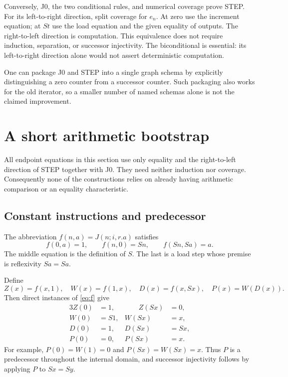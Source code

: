 \documentclass[11pt,letterpaper]{article}
\theoremstyle{definition}\newtheorem{definition}[theorem]{Definition}
\theoremstyle{remark}\newtheorem{remark}[theorem]{Remark}
\begin{document}
Conversely, J0, the two conditional rules, and numerical coverage
prove STEP. For its left-to-right direction, split coverage for $e_n$.
At zero use the increment equation; at $St$ use the load equation
and the given equality of outputs. The right-to-left direction is
computation. This equivalence does not require induction, separation,
or successor injectivity. The biconditional is essential: its
left-to-right direction alone would not assert deterministic computation.

One can package J0 and STEP into a single graph schema by explicitly
distinguishing a zero counter from a successor counter. Such packaging
also works for the old iterator, so a smaller number of named schemas
alone is not the claimed improvement.

\section{A short arithmetic bootstrap}

All endpoint equations in this section use only equality and the
right-to-left direction of STEP together with J0. They need neither
induction nor coverage. Consequently none of the constructions relies
on already having arithmetic comparison or an equality characteristic.

\subsection{Constant instructions and predecessor}

The abbreviation $f(n,a)=J(n;i,r.a)$ satisfies
\begin{equation}
 f(0,a)=1,\qquad f(n,0)=Sn,\qquad f(Sn,Sa)=a.
 \label{eq:f}
\end{equation}
The middle equation is the definition of $S$. The last is a load
step whose premise is reflexivity $Sa=Sa$.

Define
\[
 Z(x)=f(x,1),\quad W(x)=f(1,x),\quad
 D(x)=f(x,Sx),\quad P(x)=W(D(x)).
\]
Then direct instances of \eqref{eq:f} give
\begin{alignat}{3}
 Z(0)&=1,&\qquad Z(Sx)&=0,\label{eq:Z}\\
 W(0)&=S1,& W(Sx)&=x,\label{eq:W}\\
 D(0)&=1,& D(Sx)&=Sx,\label{eq:D}\\
 P(0)&=0,& P(Sx)&=x.\label{eq:P}
\end{alignat}
For example, $P(0)=W(1)=0$ and $P(Sx)=W(Sx)=x$.
Thus $P$ is a predecessor throughout the internal domain, and successor
injectivity follows by applying $P$ to $Sx=Sy$.
\end{document}
